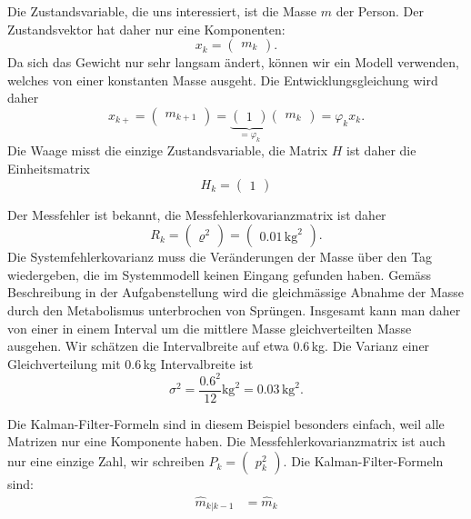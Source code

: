 \begin{loesung}
\begin{teilaufgaben}
\item
Die Zustandsvariable, die uns interessiert, ist die Masse $m$ der Person.
Der Zustandsvektor hat daher nur eine Komponenten:
\[
x_k = \begin{pmatrix}m_k\end{pmatrix}.
\]
Da sich das Gewicht nur sehr langsam ändert, können wir ein Modell verwenden,
welches von einer konstanten Masse ausgeht.
Die Entwicklungsgleichung wird daher
\[
x_{k+}
=
\begin{pmatrix}m_{k+1}\end{pmatrix}
=
\underbrace{\begin{pmatrix}1\end{pmatrix}}_{\displaystyle=\varphi_k}
\begin{pmatrix}m_k\end{pmatrix}
=
\varphi_kx_k.
\]
Die Waage misst die einzige Zustandsvariable, die Matrix $H$ ist
daher die Einheitsmatrix 
\[
H_k = \begin{pmatrix}1\end{pmatrix}
\]
\item
Der Messfehler ist bekannt, die Messfehlerkovarianzmatrix ist daher
\[
R_k
=
\begin{pmatrix} \varrho^2\end{pmatrix}
=
\begin{pmatrix} 0.01\,\text{kg}^2\end{pmatrix}.
\]
Die Systemfehlerkovarianz muss die Veränderungen der Masse über den Tag
wiedergeben, die im Systemmodell keinen Eingang gefunden haben.
Gemäss Beschreibung in der Aufgabenstellung wird die gleichmässige
Abnahme der Masse durch den Metabolismus unterbrochen von Sprüngen.
Insgesamt kann man daher von einer in einem Interval um die mittlere
Masse gleichverteilten Masse ausgehen.
Wir schätzen die Intervalbreite auf etwa 0.6\,kg.
Die Varianz einer Gleichverteilung mit 0.6\,kg Intervalbreite ist
\[
\sigma^2 = \frac{0.6^2}{12}\text{kg}^2 = 0.03\,\text{kg}^2.
\]
\item
Die Kalman-Filter-Formeln sind in diesem Beispiel besonders einfach,
weil alle Matrizen nur eine Komponente haben.
Die Messfehlerkovarianzmatrix ist auch nur eine einzige Zahl, wir
schreiben $P_k=\begin{pmatrix}p_k^2\end{pmatrix}$.
Die Kalman-Filter-Formeln sind:
\begin{align*}
\hat m_{k|k-1}&=\hat m_k

\end{align*}
\end{teilaufgaben}
\end{loesung}
